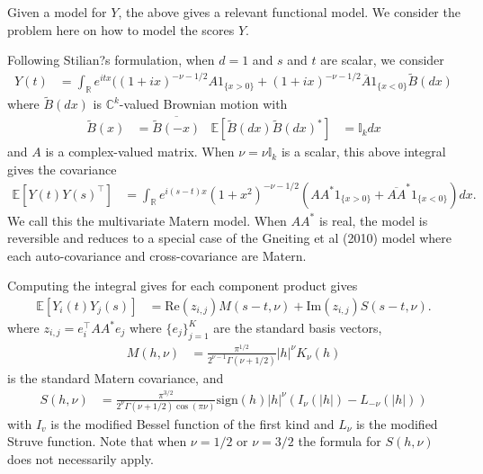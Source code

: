 \documentclass[11pt]{article}
\begin{document}
Given a model for $Y$, the above gives a relevant functional model. We consider the problem here on how to model the scores $Y$. 


Following Stilian?s formulation, when $d=1$ and $s$ and $t$ are scalar, we consider \begin{align*}
Y(t) &= \int_\mathbb{R}e^{itx}((1 + ix)^{-\nu - 1/2} A1_{\{x > 0\}} + (1 + ix)^{-\nu - 1/2} \overline{A}1_{\{x < 0\}}\tilde{B} (dx)
\end{align*}where $\tilde{B}(dx)$ is $\mathbb{C}^k$-valued Brownian motion with \begin{align*}
\tilde{B}(x) &= \overline{\tilde{B}(-x)} &  \mathbb{E}[\tilde{B}(dx) \tilde{B}(dx)^*] &= \mathbb{I}_k dx
\end{align*}and $A$ is a complex-valued matrix. When $\nu = \nu \mathbb{I}_k$ is a scalar, this above integral gives the covariance \begin{align*}
\mathbb{E}[ Y(t) Y(s)^\top ] &= \int_{\mathbb{R}} e^{i(s-t)x}(1+x^2)^{-\nu-1/2}(AA^*1_{\{x >0\}} + \overline{AA}^*1_{\{x < 0\}})dx.
\end{align*}We call this the multivariate Matern model. When $AA^*$ is real, the model is reversible and reduces to a special case of the Gneiting et al (2010) model where each auto-covariance and cross-covariance are Matern.

Computing the integral gives for each component product gives \begin{align*}
\mathbb{E}[ Y_i(t) Y_j(s) ]  &= \textrm{Re}(z_{i,j}) M( s-t, \nu) + \textrm{Im}(z_{i,j})S\left(s-t , \nu\right).
\end{align*}where $z_{i,j} = e_i^\top AA^*e_j$ where $\{e_j\}_{j=1}^K$ are the standard basis vectors,  \begin{align*}
M(h, \nu) &= \frac{\pi^{1/2}}{2^{\nu-1}\Gamma(\nu+1/2)}|h|^\nu K_\nu(h) 
\end{align*}is the standard Matern covariance, and \begin{align*}
S(h, \nu) &=\frac{\pi^{3/2}}{2^{\nu}\Gamma(\nu + 1/2) \cos(\pi \nu)} \textrm{sign}(h) |h|^\nu( I_\nu(|h|) - L_{-\nu}(|h|))
\end{align*}with $I_v$ is the modified Bessel function of the first kind and $L_\nu$ is the modified Struve function. Note that when $\nu = 1/2$ or $\nu = 3/2$ the formula for $S(h, \nu)$ does not necessarily apply. 
\end{document}
